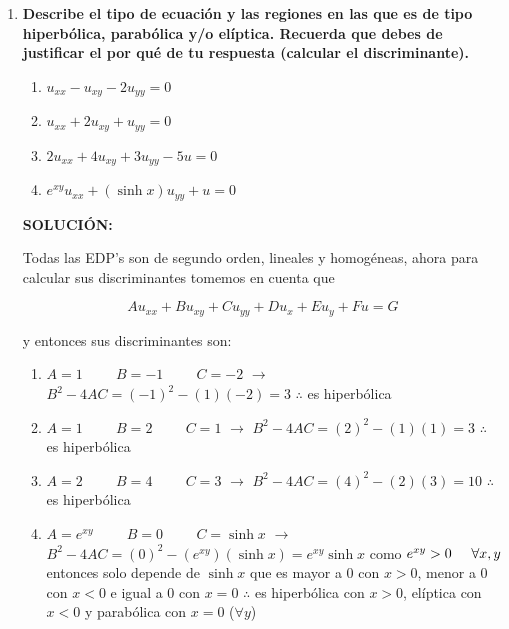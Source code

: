 \documentclass[12pt,a4paper]{article}
\begin{document}
    






\begin{enumerate}
    \item \textbf{Describe el tipo de ecuación y las regiones en las que es de tipo hiperbólica, parabólica y/o elíptica. Recuerda que debes de justificar el por qué de tu respuesta (calcular el discriminante).}
    
    \begin{enumerate}
        \item $u_{xx} - u_{xy} - 2u_{yy} = 0$
        
        \item $u_{xx} + 2 u_{xy} + u_{yy} = 0$
        
        \item $2u_{xx} + 4u_{xy} + 3u_{yy} - 5u = 0$
        
        \item $e^{xy} u_{xx} + (\sinh{x}) u_{yy} + u = 0$
    \end{enumerate}
    
    \textbf{SOLUCIÓN:}
    
    Todas las EDP's son de segundo orden, lineales y homogéneas, ahora para calcular sus discriminantes tomemos en cuenta que
    
    \begin{equation*}
        Au_{xx}+ B u_{xy} + C u_{yy} + D u_{x} + E u_{y} + F u = G
    \end{equation*}
    
    y entonces sus discriminantes son:
    
    \begin{enumerate}
        \item $A = 1 \hspace{1cm} B = -1 \hspace{1cm} C = -2$ $\rightarrow$ $B^2 -4AC = (-1)^2 - (1)(-2) = 3$ $\therefore$ es hiperbólica
        \item $A = 1 \hspace{1cm} B = 2 \hspace{1cm} C = 1$ $\rightarrow$ $B^2 - 4AC = (2)^2 - (1)(1)= 3$ $\therefore$ es hiperbólica
        \item $A = 2 \hspace{1cm} B = 4 \hspace{1cm} C= 3$ $\rightarrow$ $B^2 -4AC = (4)^2 - (2)(3) = 10$ $\therefore$ es hiperbólica
        \item $A = e^{xy} \hspace{1cm} B = 0 \hspace{1cm} C = \sinh{x}$ $\rightarrow$ $B^2-4AC = (0)^2 - (e^{xy})(\sinh{x}) = e^{xy}\sinh{x}$ como $e^{xy} > 0 \hspace{0.5cm} \forall x,y $ entonces solo depende de $\sinh{x}$ que es mayor a 0 con $x> 0$, menor a 0 con $x<0$ e igual a 0 con $x=0$ $\therefore$ es hiperbólica con $x> 0$, elíptica con $x <0$ y parabólica con $x= 0$ ($\forall y$)
    \end{enumerate}
    

\end{enumerate}
\end{document}
